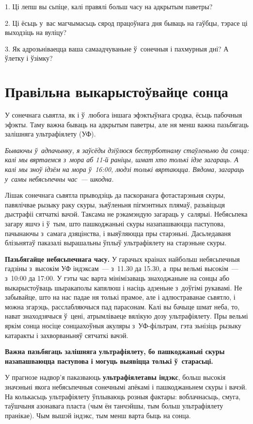 1. Ці лепш вы сьпіце, калі правялі больш часу на адкрытым паветры?

2. Ці ёсьць у~вас магчымасьць сярод працоўнага дня бываць на гаўбцы, тэрасе ці выходзіць на вуліцу?

3. Як адрозьніваецца ваша самаадчуваньне ў~сонечныя і пахмурныя дні? А ўлетку і ўзімку?


\section{Правільна выкарыстоўвайце сонца}

У сонечнага сьвятла, як і ў~любога іншага эфэктыўнага сродка, ёсьць пабочныя эфэкты. Таму важна бываць на адкрытым паветры, але ня менш важна пазьбягаць залішняга ультрафіялету (УФ).

\emph{Бываючы ў~адпачынку, я заўсёды дзіўлюся бестурботнаму стаўленьню да сонца: калі мы вяртаемся з~мора аб 11-й раніцы, шмат хто толькі ідзе загараць. А калі мы зноў ідзём на мора ў~16:00, людзі толькі вяртаюцца. Вядома, загараць у~самы небясьпечны час~--- шкодна.}

Лішак сонечнага сьвятла прыводзіць да паскоранага фотастарэньня скуры, павялічвае рызыку раку скуры, зьяўленьня пігмэнтных плямаў, разьвіцьця дыстрафіі сятчаткі вачэй. Таксама не рэкамэндую загараць у~салярыі. Небясьпека загару яшчэ і ў~тым, што пашкоджаньні скуры назапашваюцца паступова, пачынаючы з~самага дзяцінства, і выяўляюцца пры старэньні. Дасьледаваня блізьнятаў паказалі вырашальны ўплыў ультрафіялету на старэньне скуры.

\textbf{Пазьбягайце небясьпечнага часу.} У гарачых краінах найбольш небясьпечныя гадзіны з~высокім УФ індэксам~--- з~11.30 да 15.30, а~пры вельмі высокім~--- з~10:00 да 17:00. У гэты час варта мінімізаваць знаходжаньне на сонцы або выкарыстоўваць шыракаполы капялюш і насіць адзеньне з~доўгімі рукавамі. Не забывайце, што на нас падае ня толькі прамое, але і адлюстраванае сьвятло, і можна згарэць, расслабляючыся пад парасонам. Калі вы бачыце шмат неба, то, нават знаходзячыся ў~цені, атрымліваеце вялікую дозу ультрафіялету. Пры вельмі яркім сонца носіце сонцаахоўныя акуляры з~УФ-фільтрам, гэта зьнізіць рызыку катаракты і захворваньняў сятчаткі вачэй.

\textbf{Важна пазьбягаць залішняга ультрафіялету, бо пашкоджаньні скуры назапашваюцца паступова і могуць выявіцца толькі ў~старасьці.}

У прагнозе надвор'я паказваюць \textbf{ультрафіялетавы індэкс}, больш высокія значэньні якога небясьпечныя сонечнымі апёкамі і пашкоджаньнем скуры і вачэй. На колькасьць ультрафіялету ўплываюць розныя фактары: воблачнасьць, смуга, таўшчыня азонавага пласта (чым ён танчэйшы, тым больш ультрафіялету пранікае). Чым вышэй індэкс, тым менш варта быць на сонца.

